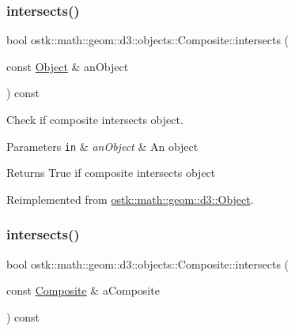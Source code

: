 \subsubsection{\texorpdfstring{intersects()}{intersects()}\hspace{0.1cm}{\footnotesize\ttfamily [1/2]}}
{\footnotesize\ttfamily bool ostk\+::math\+::geom\+::d3\+::objects\+::\+Composite\+::intersects (\begin{DoxyParamCaption}\item[{const \hyperlink{classostk_1_1math_1_1geom_1_1d3_1_1_object}{Object} \&}]{an\+Object }\end{DoxyParamCaption}) const\hspace{0.3cm}{\ttfamily [virtual]}}



Check if composite intersects object. 


\begin{DoxyParams}[1]{Parameters}
\mbox{\tt in}  & {\em an\+Object} & An object \\
\hline
\end{DoxyParams}
\begin{DoxyReturn}{Returns}
True if composite intersects object 
\end{DoxyReturn}


Reimplemented from \hyperlink{classostk_1_1math_1_1geom_1_1d3_1_1_object_a99bfe722e7508a09a629c9eb972201e6}{ostk\+::math\+::geom\+::d3\+::\+Object}.

\mbox{\label{classostk_1_1math_1_1geom_1_1d3_1_1objects_1_1_composite_a60a7aeb9a36d573e717ad6e191219201}} 
\subsubsection{\texorpdfstring{intersects()}{intersects()}\hspace{0.1cm}{\footnotesize\ttfamily [2/2]}}
{\footnotesize\ttfamily bool ostk\+::math\+::geom\+::d3\+::objects\+::\+Composite\+::intersects (\begin{DoxyParamCaption}\item[{const \hyperlink{classostk_1_1math_1_1geom_1_1d3_1_1objects_1_1_composite}{Composite} \&}]{a\+Composite }\end{DoxyParamCaption}) const}



